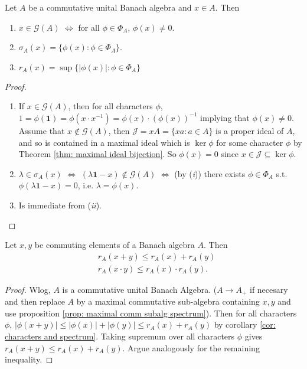 \documentclass{article}
\begin{document}
\begin{boxcor}\label{cor: characters and spectrum}
    Let $A$ be a commutative unital Banach algebra and $x\in A$. Then 
    \begin{enumerate}[label = (\roman*), align = left]
        \item $x\in \mathcal{G}(A)$ $\iff$ for all $\phi\in \Phi_A$, $\phi(x)\neq 0$.
        \item $\sigma_A(x) = \{\phi(x):\phi\in \Phi_A\}$.
        \item $r_A(x) = \sup \{|\phi(x)|:\phi\in \Phi_A\}$
    \end{enumerate}
\end{boxcor}

\begin{proof}
    \begin{enumerate}[label = (\roman*), align = left]
        \item If $x\in \mathcal{G}(A)$, then for all characters $\phi$, $1=\phi(\mathbf{1}) = \phi(x\cdot x^{-1})=\phi(x)\cdot(\phi(x))^{-1}$ implying that $\phi(x)\neq 0$.\\
        Assume that $x\not\in \mathcal{G}(A)$, then $\mathcal{J}=xA=\{xa:a\in A\}$ is a proper ideal of $A$, and so is contained in a maximal ideal which is $\ker\phi$ for some character $\phi$ by Theorem \ref{thm: maximal ideal bijection}. So $\phi(x) = 0$ since $x\in \mathcal{J}\subseteq\ker\phi$.
        \item $\lambda\in \sigma_A(x)$ $\iff$ $(\lambda\mathbf{1}-x)\not\in \mathcal{G}(A)
        $ $\iff$ (by (\textit{i})) there exists $\phi\in\Phi_A$ s.t. $\phi(\lambda\mathbf{1}-x)=0$, i.e. $\lambda = \phi(x)$.
        \item Is immediate from (\textit{ii}).
    \end{enumerate}
\end{proof}

\begin{boxcor}\label{cor: spectral radius sub-add/mult}
    Let $x,y$ be commuting elements of a Banach algebra $A$. Then 
    $$
    \begin{array}{cc}
        &r_A(x+y)\leq r_A(x)+r_A(y)\\
        &r_A(x\cdot y)\leq r_A(x)\cdot r_A(y).
    \end{array}
    $$
\end{boxcor}

\begin{proof}
    Wlog, $A$ is a commutative unital Banach Algebra. ($A\to A_+$ if necesary and then replace $A$ by a maximal commutative sub-algebra containing $x,y$ and use proposition \ref{prop: maximal comm subalg spectrum}). Then for all characters $\phi$, $|\phi(x+y)|\leq |\phi(x)|+|\phi(y)|\leq r_A(x)+r_A(y)$ by corollary \ref{cor: characters and spectrum}. Taking supremum over all characters $\phi$ gives $r_A(x+y)\leq r_A(x)+r_A(y)$. Argue analogously for the remaining inequality. 
\end{proof}
\end{document}
